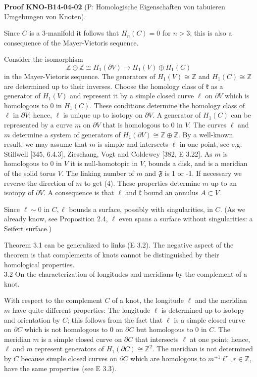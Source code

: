 \documentclass[10pt, letterpaper]{article}
\newcommand{\CustomHeading}[3]{%
  \par\medskip\noindent%
  \textbf{#1 #2} \textnormal{(#3)}.\enskip%
}
\newenvironment{PROOF}[2]{\begin{unitbox}\CustomHeading{Proof}{#1}{#2}}{\end{unitbox}}
\begin{document}
\begin{PROOF}{KNO-B14-04-02}{P: Homologische Eigenschaften von tabuieren Umgebungen von Knoten}
Since $C$ is a 3-manifold it follows that $H_{n}(C)=0$ for $n>3$; this is also a consequence of the Mayer-Vietoris sequence.

Consider the isomorphism
$$
\mathbb{Z} \oplus \mathbb{Z} \cong H_{1}(\partial V) \rightarrow H_{1}(V) \oplus H_{1}(C)
$$
in the Mayer-Vietoris sequence. The generators of $H_{1}(V) \cong \mathbb{Z}$ and $H_{1}(C) \cong \mathbb{Z}$ are determined up to their inverses. Choose the homology class of $\mathfrak{k}$ as a generator of $H_{1}(V)$ and represent it by a simple closed curve $\ell$ on $\partial V$ which is homologous to 0 in $H_{1}(C)$. These conditions determine the homology class of $\ell$ in $\partial V$; hence, $\ell$ is unique up to isotopy on $\partial V$. A generator of $H_{1}(C)$ can be represented by a curve $m$ on $\partial V$ that is homologous to 0 in $V$. The curves $\ell$ and $m$ determine a system of generators of $H_{1}(\partial V) \cong \mathbb{Z} \oplus \mathbb{Z}$. By a well-known result, we may assume that $m$ is simple and intersects $\ell$ in one point, see e.g. Stillwell [345, 6.4.3], Zieschang, Vogt and Coldewey [382, E 3.22]. As $m$ is homologous to 0 in $V$ it is null-homotopic in $V$, bounds a disk, and is a meridian of the solid torus $V$. The linking number of $m$ and $\mathfrak{F}$ is 1 or -1. If necessary we reverse the direction of $m$ to get (4). These properties determine $m$ up to an isotopy of $\partial V$. A consequence is that $\ell$ and $\mathfrak{k}$ bound an annulus $A \subset V$.

Since $\ell \sim 0$ in $C, \ell$ bounds a surface, possibly with singularities, in $C$. (As we already know, see Proposition 2.4, $\ell$ even spans a surface without singularities: a Seifert surface.)
\end{PROOF}

Theorem 3.1 can be generalized to links (E 3.2). The negative aspect of the theorem is that complements of knots cannot be distinguished by their homological properties.\\



3.2 On the characterization of longitudes and meridians by the complement of a knot. 

With respect to the complement $C$ of a knot, the longitude $\ell$ and the meridian $m$ have quite different properties: The longitude $\ell$ is determined up to isotopy and orientation by $C$; this follows from the fact that $\ell$ is a simple closed curve on $\partial C$ which is not homologous to 0 on $\partial C$ but homologous to 0 in $C$. The meridian $m$ is a simple closed curve on $\partial C$ that intersects $\ell$ at one point; hence, $\ell$ and $m$ represent generators of $H_{1}(\partial C) \cong \mathbb{Z}^{2}$. The meridian is not determined by $C$ because simple closed curves on $\partial C$ which are homologous to $m^{ \pm 1} \ell^{r}, r \in \mathbb{Z}$, have the same properties (see E 3.3).
\end{document}
